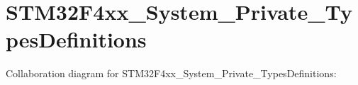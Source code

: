 \hypertarget{group___s_t_m32_f4xx___system___private___types_definitions}{}\section{S\+T\+M32\+F4xx\+\_\+\+System\+\_\+\+Private\+\_\+\+Types\+Definitions}
\label{group___s_t_m32_f4xx___system___private___types_definitions}
Collaboration diagram for S\+T\+M32\+F4xx\+\_\+\+System\+\_\+\+Private\+\_\+\+Types\+Definitions\+:
